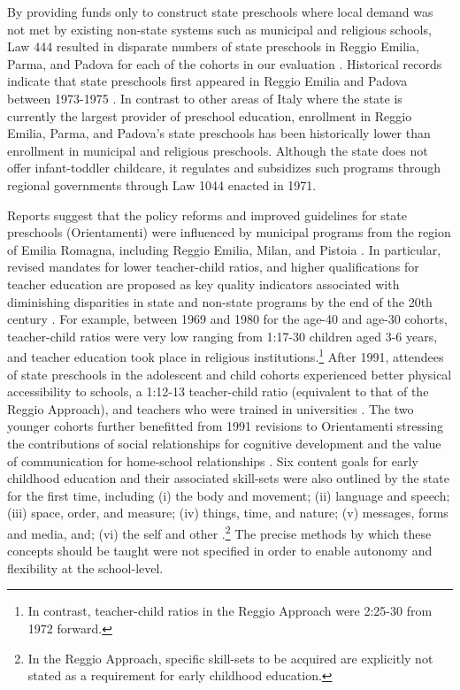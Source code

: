 By providing funds only to construct state preschools where local demand was not met by existing non-state systems such as municipal and religious schools, Law 444 resulted in disparate numbers of state preschools in Reggio Emilia, Parma, and Padova for each of the cohorts in our evaluation \citep{Hohnerlein_2009_Paradox-Public-Preschools}. Historical records indicate that state preschools first appeared in Reggio Emilia and Padova between 1973-1975 \citep{Padova-Admin-Data_1964-2011,Reggio-Admin-data_1966-2006,Reggio-Annual-Journals_1994-2011}. In contrast to other areas of Italy where the state is currently the largest provider of preschool education, enrollment in Reggio Emilia, Parma, and Padova's state preschools has been historically lower than enrollment in municipal and religious preschools. Although the state does not offer infant-toddler childcare, it regulates and subsidizes such programs through regional governments through Law 1044 enacted in 1971.

Reports suggest that the policy reforms and improved guidelines for state preschools (Orientamenti) were influenced by municipal programs from the region of Emilia Romagna, including Reggio Emilia, Milan, and Pistoia \citep{OECD_2001_Italy-Country-Note}. In particular, revised mandates for lower teacher-child ratios, and higher qualifications for teacher education are proposed as key quality indicators associated with diminishing disparities in state and non-state programs by the end of the 20th century \citep{Hohnerlein_2015_Development-and-Diffusion}. For example, between 1969 and 1980 for the age-40 and age-30 cohorts, teacher-child ratios were very low ranging from 1:17-30 children aged 3-6 years, and teacher education took place in religious institutions.\footnote{In contrast, teacher-child ratios in the Reggio Approach were 2:25-30 from 1972 forward.} After 1991, attendees of state preschools in the adolescent and child cohorts experienced better physical accessibility to schools, a 1:12-13 teacher-child ratio (equivalent to that of the Reggio Approach), and teachers who were trained in universities \citep{Hohnerlein_2015_Development-and-Diffusion}. The two younger cohorts further benefitted from 1991 revisions to Orientamenti stressing the contributions of social relationships for cognitive development and the value of communication for home-school relationships \citep{OECD_2001_Italy-Country-Note}. Six content goals for early childhood education and their associated skill-sets were also outlined by the state for the first time, including (i) the body and movement; (ii) language and speech; (iii) space, order, and measure; (iv) things, time, and nature; (v) messages, forms and media, and; (vi) the self and other \citep{Orientamenti_1991_Scuola-Materna}.\footnote{In the Reggio Approach, specific skill-sets to be acquired are explicitly not stated as a requirement for early childhood education.} The precise methods by which these concepts should be taught were not specified in order to enable autonomy and flexibility at the school-level.

